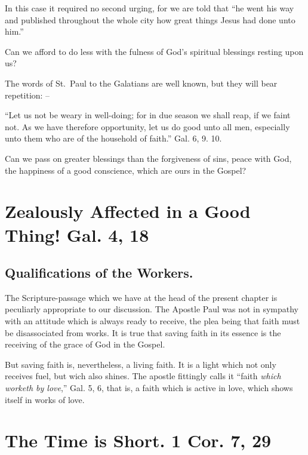 \documentclass[
]{book}
\begin{document}
In this case it required no second urging, for we are told that ``he went his way and published throughout the whole city how great things Jesus had done unto him.''

Can we afford to do less with the fulness of God's spiritual blessings resting upon us?

The words of St.~Paul to the Galatians are well known, but they will bear repetition: --

``Let us not be weary in well-doing; for in due season we shall reap, if we faint not. As we have therefore opportunity, let us do good unto all men, especially unto them who are of the household of faith.'' Gal. 6, 9. 10.

Can we pass on greater blessings than the forgiveness of sins, peace with God, the happiness of a good conscience, which are ours in the Gospel?

\hypertarget{zealously-affected-in-a-good-thing-gal.-4-18}{%
\chapter{Zealously Affected in a Good Thing! Gal. 4, 18}\label{zealously-affected-in-a-good-thing-gal.-4-18}}

\hypertarget{qualifications-of-the-workers.}{%
\section*{Qualifications of the Workers.}\label{qualifications-of-the-workers.}}

The Scripture-passage which we have at the head of the present chapter is peculiarly appropriate to our discussion. The Apostle Paul was not in sympathy with an attitude which is always ready to receive, the plea being that faith must be disassociated from works. It is true that saving faith in its essence is the receiving of the grace of God in the Gospel.

But saving faith is, nevertheless, a living faith. It is a light which not only receives fuel, but wich also shines. The apostle fittingly calls it ``faith \emph{which worketh by love},'' Gal. 5, 6, that is, a faith which is active in love, which shows itself in works of love.

\hypertarget{the-time-is-short.-1-cor.-7-29}{%
\chapter{The Time is Short. 1 Cor. 7, 29}\label{the-time-is-short.-1-cor.-7-29}}
\end{document}
